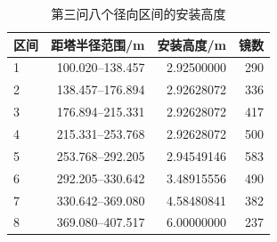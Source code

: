 \begin{table}[H]\centering\small
\caption{第三问八个径向区间的安装高度}\label{tab:q3_bands}
\begin{tabular}{lrrr}\toprule
区间 & 距塔半径范围/m & 安装高度/m & 镜数\\\midrule
1 & 100.020--138.457 & 2.92500000 & 290\\
2 & 138.457--176.894 & 2.92628072 & 336\\
3 & 176.894--215.331 & 2.92628072 & 417\\
4 & 215.331--253.768 & 2.92628072 & 500\\
5 & 253.768--292.205 & 2.94549146 & 583\\
6 & 292.205--330.642 & 3.48915556 & 490\\
7 & 330.642--369.080 & 4.58480841 & 382\\
8 & 369.080--407.517 & 6.00000000 & 237\\
\bottomrule\end{tabular}
\end{table}
